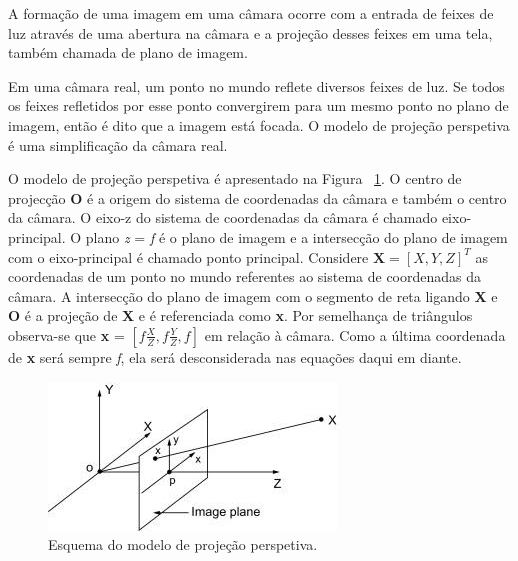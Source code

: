 A formação de uma imagem em uma câmara ocorre com a entrada de feixes de luz através de uma abertura na câmara e a projeção desses feixes em uma tela, também chamada de plano de imagem.

Em uma câmara real, um ponto no mundo reflete diversos feixes de luz. Se todos os feixes refletidos por esse ponto convergirem para um mesmo ponto no plano de imagem, então é dito que a imagem está focada. O modelo de projeção perspetiva é uma simplificação da câmara real.

O modelo de projeção perspetiva é apresentado na Figura ~\ref{fig:modelcamera}. O centro de projecção \textbf{O} é a origem do sistema de coordenadas da câmara e também o centro da câmara. O eixo-z do sistema de coordenadas da câmara é chamado eixo-principal. O plano \textit{z} = \textit{f} é o plano de imagem e a intersecção do plano de imagem com o eixo-principal é chamado ponto principal. Considere $\textbf{X} = [X,Y,Z]^T$ as coordenadas de um ponto no mundo referentes ao sistema de coordenadas da câmara. A intersecção do plano de imagem com o segmento de reta ligando \textbf{X} e \textbf{O} é a projeção de \textbf{X} e é referenciada como \textbf{x}. Por semelhança de triângulos observa-se que \textbf{x} = $[\textit{f} \frac{X}{Z} , \textit{f} \frac{Y}{Z} , \textit{f}]$ em relação à câmara. Como a última coordenada de \textbf{x} será sempre \textit{f}, ela será desconsiderada nas equações daqui em diante.

\begin{figure}[h!]  %
	\centering
	\includegraphics[width=0.6\linewidth]{figures/pinholemodel} 
	\caption{Esquema do modelo de projeção perspetiva. \cite{Yousif2015}}
	\label{fig:modelcamera}  %
\end{figure}


